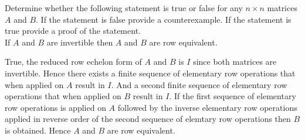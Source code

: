 
\begin{Exercise}[
name={},
title={}, 
difficulty=0,
origin={\cite{YL}}]
Determine whether the following statement is true or false for any $n\times n$
matrices $A$ and $B$.  If the statement is false provide a counterexample. If the
statement is true provide a proof of the statement.\\

If $A$ and $B$ are invertible then $A$ and $B$ are row equivalent.
\end{Exercise}

\begin{Answer}
True, the reduced row echelon form of $A$ and $B$ is $I$ since both matrices are invertible.  Hence there exists a finite sequence of elementary row operations that when applied on $A$ result in $I$. And a second finite sequence of elementary row operations that when applied on $B$ result in $I$.  If the first sequence of elementary row operations is applied on $A$ followed by the inverse elementary row operations applied in reverse order of the second sequence of elemtary row operations then $B$ is obtained.  Hence $A$ and $B$ are row equivalent.
\end{Answer}
